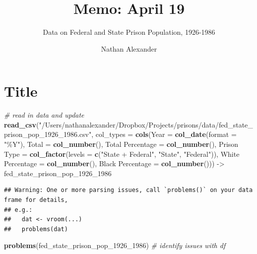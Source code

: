\documentclass[
]{article}
\title{Memo: April 19}
\subtitle{Data on Federal and State Prison Population, 1926-1986}
\author{Nathan Alexander}
\date{}
\newenvironment{Shaded}{\begin{snugshade}}{\end{snugshade}}
\newcommand{\AttributeTok}[1]{\textcolor[rgb]{0.13,0.29,0.53}{#1}}
\newcommand{\CommentTok}[1]{\textcolor[rgb]{0.56,0.35,0.01}{\textit{#1}}}
\newcommand{\FunctionTok}[1]{\textcolor[rgb]{0.13,0.29,0.53}{\textbf{#1}}}
\newcommand{\NormalTok}[1]{#1}
\newcommand{\OtherTok}[1]{\textcolor[rgb]{0.56,0.35,0.01}{#1}}
\newcommand{\StringTok}[1]{\textcolor[rgb]{0.31,0.60,0.02}{#1}}
\begin{document}
\maketitle

\hypertarget{title}{%
\section{Title}\label{title}}

\begin{Shaded}
\begin{Highlighting}[]
\CommentTok{\# read in data and update}
\FunctionTok{read\_csv}\NormalTok{(}\StringTok{"/Users/nathanalexander/Dropbox/Projects/prisons/data/fed\_state\_prison\_pop\_1926\_1986.csv"}\NormalTok{,}
         \AttributeTok{col\_types =} \FunctionTok{cols}\NormalTok{(}\AttributeTok{Year =} \FunctionTok{col\_date}\NormalTok{(}\AttributeTok{format =} \StringTok{"\%Y"}\NormalTok{),}
                          \AttributeTok{Total =} \FunctionTok{col\_number}\NormalTok{(),}
                          \StringTok{\textasciigrave{}}\AttributeTok{Total Percentage}\StringTok{\textasciigrave{}} \OtherTok{=} \FunctionTok{col\_number}\NormalTok{(),}
                          \StringTok{\textasciigrave{}}\AttributeTok{Prison Type}\StringTok{\textasciigrave{}} \OtherTok{=} \FunctionTok{col\_factor}\NormalTok{(}\AttributeTok{levels =} \FunctionTok{c}\NormalTok{(}\StringTok{"State + Federal"}\NormalTok{, }\StringTok{"State"}\NormalTok{, }\StringTok{"Federal"}\NormalTok{)), }
                          \StringTok{\textasciigrave{}}\AttributeTok{White Percentage}\StringTok{\textasciigrave{}} \OtherTok{=} \FunctionTok{col\_number}\NormalTok{(),}
                          \StringTok{\textasciigrave{}}\AttributeTok{Black Percentage}\StringTok{\textasciigrave{}} \OtherTok{=} \FunctionTok{col\_number}\NormalTok{())) }\OtherTok{{-}\textgreater{}}\NormalTok{ fed\_state\_prison\_pop\_1926\_1986}
\end{Highlighting}
\end{Shaded}

\begin{verbatim}
## Warning: One or more parsing issues, call `problems()` on your data frame for details,
## e.g.:
##   dat <- vroom(...)
##   problems(dat)
\end{verbatim}

\begin{Shaded}
\begin{Highlighting}[]
\FunctionTok{problems}\NormalTok{(fed\_state\_prison\_pop\_1926\_1986) }\CommentTok{\# identify issues with df}
\end{Highlighting}
\end{Shaded}
\end{document}
